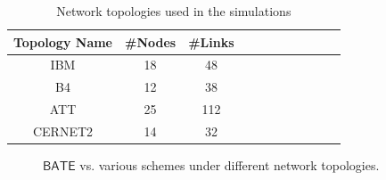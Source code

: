 \documentclass[sigconf]{acmart}
\begin{document}
\begin{table}
\centering
\caption{Network topologies used in the simulations}\label{evaluation-topologies}
\renewcommand{\arraystretch}{1.0}
\begin{tabular}{|c|c|c|c|c|c|c|c|c|c|c|} \hline
\setlength{\tabcolsep}{10pt}
\textbf{Topology Name}&\textbf{\#Nodes}&\textbf{\#Links}\\
\hline
IBM&18&48\\
\hline
B4&12&38\\
\hline
ATT&25&112\\
\hline
CERNET2&14&32\\
\hline
\end{tabular}
\end{table}

\begin{figure}[t]
\centering
{}
\caption{$\mathsf{BATE}$  vs. various schemes under different network topologies.}
\label{availability_fig1}
\end{figure}
\end{document}
